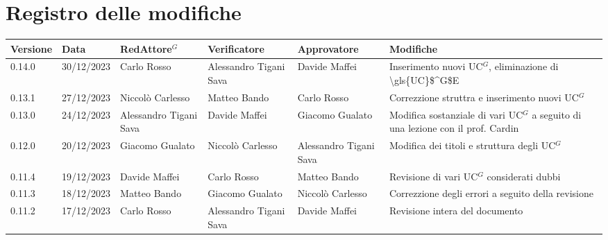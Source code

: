 \section*{Registro delle modifiche}


\begin{table}[H]
	\centering
	\fontsize{10}{12}\selectfont
	\begin{tabularx}{\textwidth}{X|X|X|X|X|X}
		\textbf{Versione}     & \textbf{Data}        & \textbf{Red\gls{Attore}$^G$}     &
		\textbf{Verificatore} & \textbf{Approvatore} & \textbf{Modifiche}                                                                                                                    \\
		\toprule
		0.14.0	              & 30/12/2023            & Carlo Rosso            & Alessandro Tigani Sava & Davide Maffei            & Inserimento nuovi \gls{UC}$^G$, eliminazione di \gls{\gls{UC}$^G$E}                                     \\
		\hline
		0.13.1	              & 27/12/2023           & Niccolò Carlesso       & Matteo Bando           & Carlo Rosso            & Correzzione struttra e inserimento nuovi \gls{UC}$^G$                                     \\
		\hline
		0.13.0	              & 24/12/2023           & Alessandro Tigani Sava & Davide Maffei          & Giacomo Gualato        & Modifica sostanziale di vari \gls{UC}$^G$ a seguito di una lezione con il prof. Cardin                                     \\
		\hline
		0.12.0	              & 20/12/2023           & Giacomo Gualato        & Niccolò Carlesso       & Alessandro Tigani Sava & Modifica dei titoli e struttura degli \gls{UC}$^G$                                     \\
		\hline
		0.11.4	              & 19/12/2023           & Davide Maffei          & Carlo Rosso            & Matteo Bando           & Revisione di vari \gls{UC}$^G$ considerati dubbi                                     \\
		\hline
		0.11.3                & 18/12/2023           & Matteo Bando           & Giacomo Gualato        & Niccolò Carlesso       & Correzzione degli errori a seguito della revisione                                     \\
		\hline
		0.11.2                & 17/12/2023           & Carlo Rosso            & Alessandro Tigani Sava & Davide Maffei          & Revisione intera del documento                                     \\

\end{tabularx}
\end{table}
